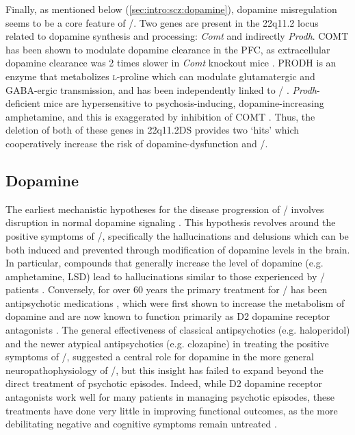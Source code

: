 Finally, as mentioned below (\autoref{sec:intro:scz:dopamine}), dopamine misregulation seems to be a core feature of \scz/.
Two genes are present in the 22q11.2 locus related to dopamine synthesis and processing: \emph{Comt} and indirectly \emph{Prodh}.
COMT has been shown to modulate dopamine clearance in the \ac{PFC}, as extracellular dopamine clearance was 2 times slower in \emph{Comt} knockout mice \citep{Kaenmaki2010}.
PRODH is an enzyme that metabolizes \textsc{l}-proline which can modulate glutamatergic and GABA-ergic transmission, and has been independently linked to \scz/ \citep{Liu2002, Crabtree2016}.
\emph{Prodh}-deficient mice are hypersensitive to psychosis-inducing, dopamine-increasing amphetamine, and this is exaggerated by inhibition of COMT \citep{Paterlini2005}. 
Thus, the deletion of both of these genes in 22q11.2DS provides two `hits' which cooperatively increase the risk of dopamine-dysfunction and \scz/.

\subsection{Dopamine}
\label{sec:intro:scz:dopamine}
The earliest mechanistic hypotheses for the disease progression of \scz/ involves disruption in normal dopamine signaling \citep{Matthysse1973}.
This hypothesis revolves around the positive symptoms of \scz/, specifically the hallucinations and delusions which can be both induced and prevented through modification of dopamine levels in the brain.
In particular, compounds that generally increase the level of dopamine (e.g. amphetamine, LSD) lead to hallucinations similar to those experienced by \scz/ patients \citep{Angrist1994, Lieberman1987}.
Conversely, for over 60 years the primary treatment for \scz/ has been antipsychotic medications \citep{Delay1952}, which were first shown to increase the metabolism of dopamine \citep{Carlsson1963} and are now known to function primarily as D2 dopamine receptor antagonists \citep{Kapur2003}.
The general effectiveness of classical antipsychotics (e.g. haloperidol) and the newer atypical antipsychotics (e.g. clozapine) in treating the positive symptoms of \scz/, suggested a central role for dopamine in the more general neuropathophysiology of \scz/, but this insight has failed to expand beyond the direct treatment of psychotic episodes.
Indeed, while D2 dopamine receptor antagonists work well for many patients in managing psychotic episodes, these treatments have done very little in improving functional outcomes, as the more debilitating negative and cognitive symptoms remain untreated \citep{Insel2010a}.

